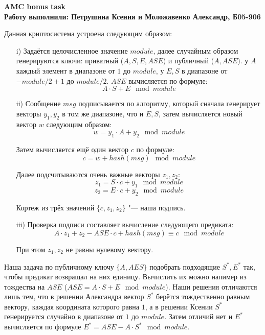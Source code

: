 \documentclass[a4paper, 14pt]{article}
\numberwithin{equation}{section}
\begin{document}
\begin{center}
    \textbf{AMC bonus task}\\
    \textbf{Работу выполнили: Петрушина Ксения и Моложавенко Александр, Б05-906 }
\end{center}


Данная криптосистема устроена следующим образом:
	\begin{enumerate}
		\item[i)] Задаётся целочисленное значение $module$, далее случайным образом генерируются ключи: приватный ($A, S, E, ASE$) и публичный ($A, ASE$). у $A$ каждый элемент в диапазоне от $1$ до $module$, у $E, S$ в диапазоне от $-module/2 + 1$ до $module/2$. $ASE$ вычисляется по формуле:
		\begin{equation*}
			A \cdot S + E \mod{module} 	
		\end{equation*} 
		\item[ii)] Сообщение $msg$ подписывается по алгоритму, который сначала генерирует векторы $y_1, y_2$ в том же диапазоне, что и $E, S$, затем вычисляется новый вектор $w$ следующим образом:
		\begin{equation*}
			w = y_1 \cdot A + y_2 \mod{module}
		\end{equation*}

		Затем вычисляется ещё один вектор $c$ по формуле:
		\begin{equation*}
			c = w + hash(msg) \mod{module}
		\end{equation*}

		Далее подсчитываются очень важные векторы $z_1, z_2$:
		\begin{equation*}
			z_1 = S\cdot c + y_1 \mod{module}
		\end{equation*}
		\begin{equation*}
			z_2 = E\cdot c + y_2 \mod{module}
		\end{equation*}

		Кортеж из трёх значений $\{c, z_1, z_2\}$ "--- наша подпись.
		\item[iii)] Проверка подписи составляет вычисление следующего предиката:
		\begin{equation}\label{eq1}
			A\cdot z_1 + z_2 - ASE\cdot c + hash(msg) \equiv c \mod{module}
		\end{equation}

		При этом $z_1, z_2$ не равны нулевому вектору.
	\end{enumerate}

	Наша задача по публичному ключу $\{A, AES\}$ подобрать подходящие $S^*, E^*$ так, чтобы предикат возвращал на них единицу. Вычислить их можно напимер из тождества на $ASE$ ($ASE = A\cdot S + E \mod{module}$). Наши решения отличаются лишь тем, что в решении Александра вектор $S^*$ берётся тождественно равным вектору, каждая координата которого равна $1$, а в решении Ксении $S^*$ генерируется случайно в диапазоне от $1$ до $module$. Затем отличий нет и $E^*$ вычисляется по формуле $E^* = ASE - A\cdot S^* \mod{module}$. 
\end{document}
